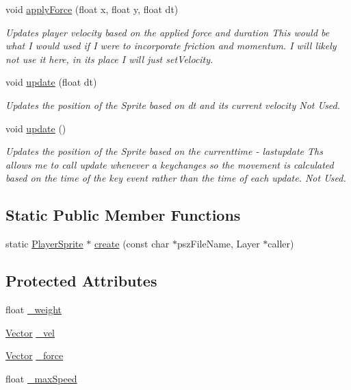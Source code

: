 \begin{DoxyCompactItemize}
void \hyperlink{class_player_sprite_ad5eede6c47652babec88d0c056d50888}{apply\-Force} (float x, float y, float dt)
\begin{DoxyCompactList}\small\item\em \-Updates player velocity based on the applied force and duration \-This would be what \-I would used if \-I were to incorporate friction and momentum. \-I will likely not use it here, in its place \-I will just set\-Velocity. \end{DoxyCompactList}\item 
void \hyperlink{class_player_sprite_a4ac7a2771c849ab2ca889ab33d9d4aa9}{update} (float dt)
\begin{DoxyCompactList}\small\item\em \-Updates the position of the \-Sprite based on dt and its current velocity \-Not \-Used. \end{DoxyCompactList}\item 
void \hyperlink{class_player_sprite_a6c4cb72fa72b21098eb3241e8b0795e6}{update} ()
\begin{DoxyCompactList}\small\item\em \-Updates the position of the \-Sprite based on the currenttime -\/ lastupdate \-Ths allows me to call update whenever a keychanges so the movement is calculated based on the time of the key event rather than the time of each update. \-Not \-Used. \end{DoxyCompactList}\end{DoxyCompactItemize}
\subsection*{\-Static \-Public \-Member \-Functions}
\begin{DoxyCompactItemize}
\item 
static \hyperlink{class_player_sprite}{\-Player\-Sprite} $\ast$ \hyperlink{class_player_sprite_aa3ed62f03be9c93af9f531be066384d1}{create} (const char $\ast$psz\-File\-Name, \-Layer $\ast$caller)
\end{DoxyCompactItemize}
\subsection*{\-Protected \-Attributes}
\begin{DoxyCompactItemize}
\item 
float \hyperlink{class_player_sprite_ae2d7c734bea5fd1f590ac33854a2ceed}{\-\_\-weight}
\item 
\hyperlink{struct_vector}{\-Vector} \hyperlink{class_player_sprite_afe7c3cf489f98746ee798ea4e6d18f0d}{\-\_\-vel}
\item 
\hyperlink{struct_vector}{\-Vector} \hyperlink{class_player_sprite_a757b1bae929885dad7d92c53bcd2e9b1}{\-\_\-force}
\item 
float \hyperlink{class_player_sprite_a5b5a402a9273c0367e51f6e47256d4f3}{\-\_\-max\-Speed}
\end{DoxyCompactItemize}


